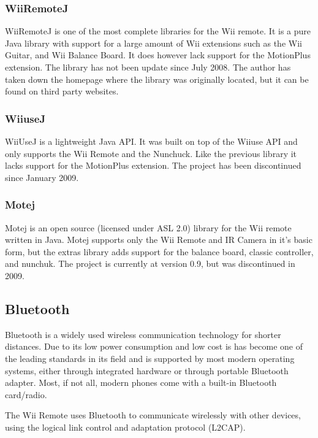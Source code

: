 \documentclass[11pt,twoside,a4paper]{report}
\begin{document}
\subsubsection{WiiRemoteJ}
WiiRemoteJ is one of the most complete libraries for the Wii remote. It is a pure Java library with support for a large amount of Wii extensions such as the Wii Guitar, and Wii Balance Board. It does however lack support for the MotionPlus extension. The library has not been update since July 2008. The author has taken down the homepage where the library was originally located, but it can be found on third party websites. \cite{WiiRemoteJ}

\subsubsection{WiiuseJ}
WiiUseJ is a lightweight Java API. It was built on top of the Wiiuse API and only supports the Wii Remote and the Nunchuck. Like the previous library it lacks support for the MotionPlus extension. The project has been discontinued since January 2009. \cite{Wiiusej}

\subsubsection{Motej}
Motej is an open source (licensed under ASL 2.0) library for the Wii remote written in Java. Motej supports only the Wii Remote and IR Camera in it's basic form, but the extras library adds support for the balance board, classic controller, and nunchuk. The project is currently at version 0.9, but was discontinued in 2009. \cite{Motej}



\subsection{Bluetooth}
Bluetooth is a widely used wireless communication technology for shorter distances. Due to its low power consumption and low cost is has become one of the leading standards in its field and is supported by most modern operating systems, either through integrated hardware or through portable Bluetooth adapter. Most, if not all, modern phones come with a built-in Bluetooth card/radio. %

The Wii Remote uses Bluetooth to communicate wirelessly with other devices, using the logical link control and adaptation protocol (L2CAP). 
\end{document}
